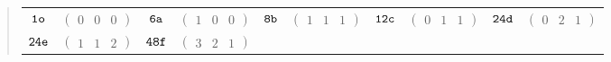 \documentclass[fleqn,9pt,landscape]{jsarticle}
\begin{document}
\begin{quote}
\begin{tabular}{cccccccccc}
$ {\tt 1o} $ & $ \begin{pmatrix} 0 & 0 & 0 \end{pmatrix} $ & $ {\tt 6a} $ & $ \begin{pmatrix} 1 & 0 & 0 \end{pmatrix} $ & $ {\tt 8b} $ & $ \begin{pmatrix} 1 & 1 & 1 \end{pmatrix} $ & $ {\tt 12c} $ & $ \begin{pmatrix} 0 & 1 & 1 \end{pmatrix} $ & $ {\tt 24d} $ & $ \begin{pmatrix} 0 & 2 & 1 \end{pmatrix} $ \\
$ {\tt 24e} $ & $ \begin{pmatrix} 1 & 1 & 2 \end{pmatrix} $ & $ {\tt 48f} $ & $ \begin{pmatrix} 3 & 2 & 1 \end{pmatrix} $ & $  $ & $  $ & $  $ & $  $ & $  $ & $  $
\end{tabular}
\end{quote}
\newpage
\end{document}
